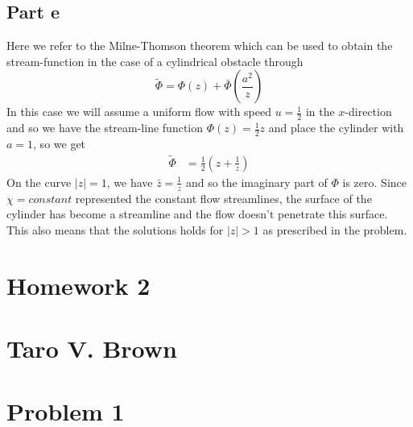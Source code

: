 \documentclass[a4paper,12pt]{article}
\begin{document}
\subsection*{Part e}
Here we refer to the Milne-Thomson theorem which can be used to obtain the stream-function in the case of a cylindrical obstacle through
\begin{equation}
\tilde \Phi=\Phi(z)+\bar \Phi\left(\frac{a^2}{z}\right)
\end{equation}
In this case we will assume a uniform flow with speed $u=\frac{1}{2}$ in the $x$-direction and so we have the stream-line function $\Phi(z)=\frac{1}{2}z$ and place the cylinder with $a=1$, so we get 
\begin{equation}
	\begin{aligned}
	\tilde \Phi&= \frac{1}{2}\left(z+\frac{1}{z}\right)
	\end{aligned}
\end{equation}
On the curve $|z|=1$, we have $\bar z = \frac{1}{z}$ and so the imaginary part of $\Phi$ is zero. Since $\chi=constant$ represented the constant flow streamlines, the surface of the cylinder has become a streamline and the flow doesn't penetrate this surface. This also means that the solutions holds for $|z|>1$ as prescribed in the problem.
\newpage
\section*{Homework 2\\\\
	Taro V. Brown}\vspace*{1cm}
\section*{Problem 1}
\end{document}
